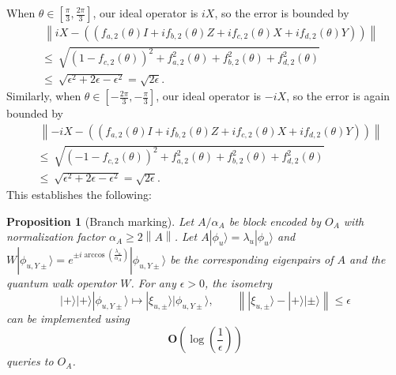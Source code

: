 \documentclass[letterpaper,onecolumn,11pt,accepted=2026-02-14]{quantumarticle}
\newcommand{\norm}[1]{\left\lVert#1\right\rVert}
\newtheorem{proposition}[lemma]{Proposition}
\theoremstyle{remark}
\theoremstyle{plain}
\newcommand{\ket}[1]{|#1\rangle}
\begin{document}
When $\theta\in\left[\frac{\pi}{3},\frac{2\pi}{3}\right]$, our ideal operator is $iX$, so the error is bounded by
\begin{equation}
\begin{aligned}
    &\ \norm{iX-\left(\left(f_{a,2}(\theta)I+if_{b,2}(\theta)Z+if_{c,2}(\theta)X+if_{d,2}(\theta)Y\right)\right)}\\
    &\leq\ \sqrt{
    (1-f_{c,2}(\theta))^2+f_{a,2}^2(\theta)+f_{b,2}^2(\theta)+f_{d,2}^2(\theta)}\\
    &\leq\ \sqrt{\epsilon^2+2\epsilon-\epsilon^2}
    =\sqrt{2\epsilon}.
\end{aligned}
\end{equation}
Similarly, when $\theta\in\left[-\frac{2\pi}{3},-\frac{\pi}{3}\right]$, our ideal operator is $-iX$, so the error is again bounded by
\begin{equation}
\begin{aligned}
    &\ \norm{-iX-\left(\left(f_{a,2}(\theta)I+if_{b,2}(\theta)Z+if_{c,2}(\theta)X+if_{d,2}(\theta)Y\right)\right)}\\
    &\leq\ \sqrt{
    (-1-f_{c,2}(\theta))^2+f_{a,2}^2(\theta)+f_{b,2}^2(\theta)+f_{d,2}^2(\theta)}\\
    &\leq\ \sqrt{\epsilon^2+2\epsilon-\epsilon^2}
    =\sqrt{2\epsilon}.
\end{aligned}
\end{equation}
This establishes the following:
\begin{proposition}[Branch marking]
\label{prop:bm}
Let $A/\alpha_A$ be block encoded by $O_A$ with normalization factor $\alpha_A\geq2\norm{A}$. 
Let $A\ket{\phi_u}=\lambda_u\ket{\phi_u}$ and $W\ket{\phi_{u,Y\pm}}= e^{\pm i\arccos\left(\frac{\lambda_u}{\alpha_A}\right)}\ket{\phi_{u,Y\pm}}$ be the corresponding eigenpairs of $A$ and the quantum walk operator $W$.
For any $\epsilon>0$, the isometry
    \begin{equation}
        \ket{+}\ket{+}\ket{\phi_{u,Y\pm}}\mapsto
        \ket{\xi_{u,\pm}}\ket{\phi_{u,Y\pm}},\qquad
        \norm{\ket{\xi_{u,\pm}}-\ket{+}\ket{\pm}}\leq\epsilon
    \end{equation}
can be implemented using
    \begin{equation}
        \mathbf{O}\left(\log\left(\frac{1}{\epsilon}\right)\right)
    \end{equation}
    queries to $O_A$.
\end{proposition}
\end{document}
